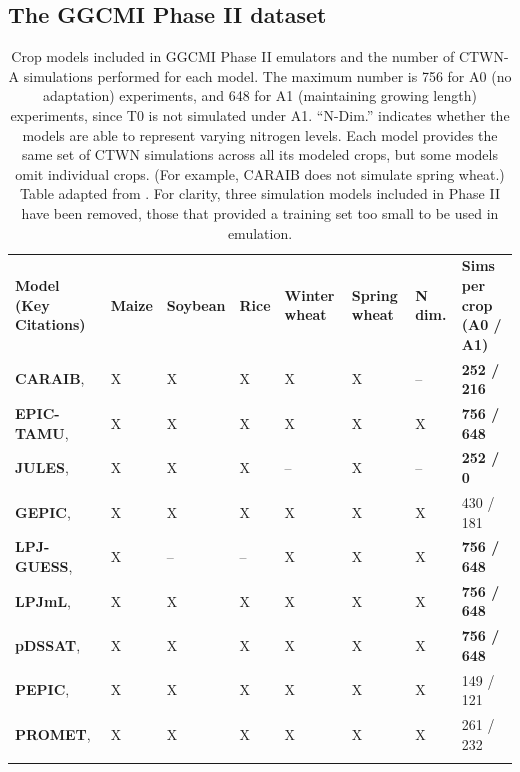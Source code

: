 \documentclass[gmd, manuscript]{copernicus} %
\begin{document}
\subsection{The GGCMI Phase II dataset}

\begin{table}[ht]
    \caption{
    Crop models included in GGCMI Phase II emulators and the number of CTWN-A simulations performed for each model. 
    The maximum number is 756 for A0 (no adaptation) experiments, and 648 for A1 (maintaining growing length) experiments, since T0 is not simulated under A1. ``N-Dim.'' indicates whether the models are able to represent varying nitrogen levels.
    Each model provides the same set of CTWN simulations across all its modeled crops, but some models omit individual crops. 
    (For example, CARAIB does not simulate spring wheat.)
    Table adapted from \citet{franke2019ctwnexperiment}. 
    For clarity, three simulation models included in Phase II have been removed, those that provided a training set too small to be used in emulation.
    }
    \label{table:models}
    \begin{tabular}{p{6cm} p{1cm} p{1cm} p{1cm} p{1cm} p{1cm} p{1cm} p{1.9cm}}
        \tophline
        \textbf{Model (Key Citations)} & \textbf{Maize} & \textbf{Soybean} & \textbf{Rice} & \textbf{Winter wheat} & \textbf{Spring wheat} & \textbf{N dim.} & \textbf{Sims per crop (A0 / A1)}\\ \middlehline
        \textbf{CARAIB},    \citet{Dury2011, Pirttioja2015}    & X & X & X & X & X & -- & \textbf{252 / 216} \\ \middlehline
        \textbf{EPIC-TAMU}, \citet{Izaurralde06}               & X & X & X & X & X & X & \textbf{756 / 648} \\ \middlehline
        \textbf{JULES},     \citet{Osborne2015, Williams2015, Williams2017} & X & X & X & -- & X & -- & \textbf{252 / 0}\\ \middlehline
        \textbf{GEPIC},     \citet{LIU2007478, FOLBERTH201221} & X & X & X & X & X & X & 430 / 181\\ \middlehline
        \textbf{LPJ-GUESS}, \citet{Lindeskog2013, Olin2015}    & X & -- & -- & X & X & X & \textbf{756 / 648}\\  \middlehline
        \textbf{LPJmL},     \citet{von_Bloh_implementing_2018} & X & X & X & X & X & X & \textbf{756 / 648}\\ \middlehline
        \textbf{pDSSAT},    \citet{Elliott2014b, JONES2003235} & X & X & X & X & X & X & \textbf{756 / 648}\\ \middlehline
        \textbf{PEPIC},     \citet{LIU2016164, LIU2016}        & X & X & X & X & X & X & 149 / 121\\ \middlehline
        \textbf{PROMET},    \citet{Hank2015, MAUSER2015}       & X & X & X & X & X & X & 261 / 232\\
        \bottomhline
    \end{tabular}
\end{table}
\end{document}
